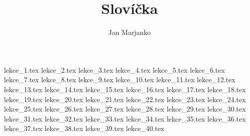 \documentclass[article]{jlreq}
\title{Slovíčka}
\author{Jan Marjanko}
\begin{document}
\maketitle
\tableofcontents
\newpage

{lekce_1.tex}
{lekce_2.tex}
{lekce_3.tex}
{lekce_4.tex}
{lekce_5.tex}
{lekce_6.tex}
{lekce_7.tex}
{lekce_8.tex}
{lekce_9.tex}
{lekce_10.tex}
{lekce_11.tex}
{lekce_12.tex}
{lekce_13.tex}
{lekce_14.tex}
{lekce_15.tex}
{lekce_16.tex}
{lekce_17.tex}
{lekce_18.tex}
{lekce_19.tex}
{lekce_20.tex}
{lekce_21.tex}
{lekce_22.tex}
{lekce_23.tex}
{lekce_24.tex}
{lekce_25.tex}
{lekce_26.tex}
{lekce_27.tex}
{lekce_28.tex}
{lekce_29.tex}
{lekce_30.tex}
{lekce_31.tex}
{lekce_32.tex}
{lekce_33.tex}
{lekce_34.tex}
{lekce_35.tex}
{lekce_36.tex}
{lekce_37.tex}
{lekce_38.tex}
{lekce_39.tex}
{lekce_40.tex}
\end{document}
